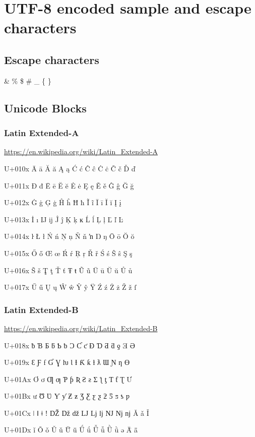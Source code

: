\chapter{UTF-8 encoded sample and escape characters}

\section{Escape characters}
\& \% \$ \# \_ \{ \}
\section{Unicode Blocks}

\subsection{Latin Extended-A}
\url{https://en.wikipedia.org/wiki/Latin_Extended-A}

U+010x 	Ā 	ā 	Ă 	ă 	Ą 	ą 	Ć 	ć 	Ĉ 	ĉ 	Ċ 	ċ 	Č 	č 	Ď 	ď

U+011x 	Đ 	đ 	Ē 	ē 	Ĕ 	ĕ 	Ė 	ė 	Ę 	ę 	Ě 	ě 	Ĝ 	ĝ 	Ğ 	ğ

U+012x 	Ġ 	ġ 	Ģ 	ģ 	Ĥ 	ĥ 	Ħ 	ħ 	Ĩ 	ĩ 	Ī 	ī 	Ĭ 	ĭ 	Į 	į

U+013x 	İ 	ı 	Ĳ 	ĳ 	Ĵ 	ĵ 	Ķ 	ķ 	ĸ 	Ĺ 	ĺ 	Ļ 	ļ 	Ľ 	ľ 	Ŀ

U+014x 	ŀ 	Ł 	ł 	Ń 	ń 	Ņ 	ņ 	Ň 	ň 	ŉ 	Ŋ 	ŋ 	Ō 	ō 	Ŏ 	ŏ

U+015x 	Ő 	ő 	Œ 	œ 	Ŕ 	ŕ 	Ŗ 	ŗ 	Ř 	ř 	Ś 	ś 	Ŝ 	ŝ 	Ş 	ş

U+016x 	Š 	š 	Ţ 	ţ 	Ť 	ť 	Ŧ 	ŧ 	Ũ 	ũ 	Ū 	ū 	Ŭ 	ŭ 	Ů 	ů

U+017x 	Ű 	ű 	Ų 	ų 	Ŵ 	ŵ 	Ŷ 	ŷ 	Ÿ 	Ź 	ź 	Ż 	ż 	Ž 	ž 	ſ

\subsection{Latin Extended-B}
\url{https://en.wikipedia.org/wiki/Latin_Extended-B}

U+018x 	ƀ 	Ɓ 	Ƃ 	ƃ 	Ƅ 	ƅ 	Ɔ 	Ƈ 	ƈ 	Ɖ 	Ɗ 	Ƌ 	ƌ 	ƍ 	Ǝ 	Ə

U+019x 	Ɛ 	Ƒ 	ƒ 	Ɠ 	Ɣ 	ƕ 	Ɩ 	Ɨ 	Ƙ 	ƙ 	ƚ 	ƛ 	Ɯ 	Ɲ 	ƞ 	Ɵ

U+01Ax 	Ơ 	ơ 	Ƣ 	ƣ 	Ƥ 	ƥ 	Ʀ 	Ƨ 	ƨ 	Ʃ 	ƪ 	ƫ 	Ƭ 	ƭ 	Ʈ 	Ư

U+01Bx 	ư 	Ʊ 	Ʋ 	Ƴ 	ƴ 	Ƶ 	ƶ 	Ʒ 	Ƹ 	ƹ 	ƺ 	ƻ 	Ƽ 	ƽ 	ƾ 	ƿ

U+01Cx 	ǀ 	ǁ 	ǂ 	ǃ 	Ǆ 	ǅ 	ǆ 	Ǉ 	ǈ 	ǉ 	Ǌ 	ǋ 	ǌ 	Ǎ 	ǎ 	Ǐ

U+01Dx 	ǐ 	Ǒ 	ǒ 	Ǔ 	ǔ 	Ǖ 	ǖ 	Ǘ 	ǘ 	Ǚ 	ǚ 	Ǜ 	ǜ 	ǝ 	Ǟ 	ǟ

